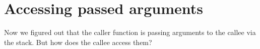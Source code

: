\chapter{Accessing passed arguments}
\myindex{\Stack}

Now we figured out that the \gls{caller} function is passing arguments to the \gls{callee} via the stack. 
But how does the \gls{callee} access them?








